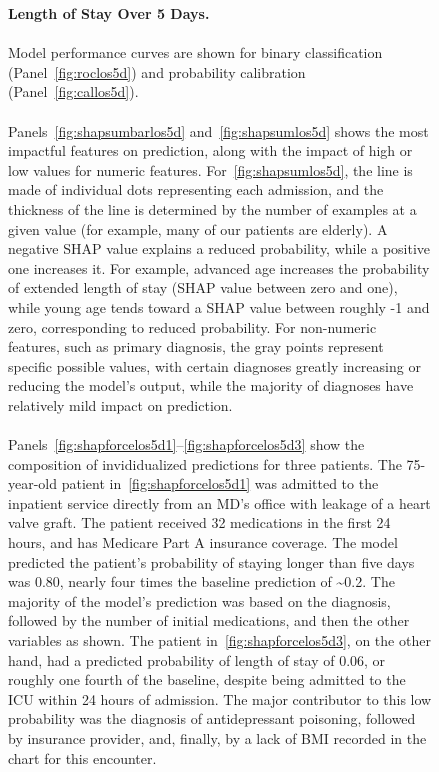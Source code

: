 \begin{figure}
\begin{adjustbox}{minipage={\linewidth},frame}
\caption{\textbf{Length of Stay Over 5 Days.} \\\\
Model performance curves are shown for binary classification (Panel~\ref{fig:roclos5d}) and probability calibration (Panel~\ref{fig:callos5d}).\\\\
Panels~\ref{fig:shapsumbarlos5d} and~\ref{fig:shapsumlos5d} shows the most impactful features on prediction, 
along with the impact of high or low values for numeric features.%
For~\ref{fig:shapsumlos5d}, the line is made of individual dots representing each admission,
and the thickness of the line is determined by the number of examples at a given value (for example, many of our patients are elderly).
A negative SHAP value explains a reduced probability, while a positive one increases it.
For example, advanced age increases the probability of extended length of stay (SHAP value between zero and one), 
while young age tends toward a SHAP value between roughly -1 and zero, corresponding to reduced probability.
For non-numeric features, such as primary diagnosis, the gray points represent specific possible values, with certain diagnoses greatly
increasing or reducing the model's output, while the majority of diagnoses have relatively mild impact on prediction.\\\\
Panels~\ref{fig:shapforcelos5d1}--\ref{fig:shapforcelos5d3} show the composition of invididualized predictions for three patients.
The 75-year-old patient in~\ref{fig:shapforcelos5d1} was admitted to the inpatient service directly from an MD's office with leakage of a heart valve graft.
The patient received 32 medications in the first 24 hours, and has Medicare Part A insurance coverage.
The model predicted the patient's probability of staying longer than five days was 0.80, 
nearly four times the baseline prediction of \textasciitilde0.2.
The majority of the model's prediction was based on the diagnosis, followed by the number of initial medications, and then the other variables as shown.
The patient in~\ref{fig:shapforcelos5d3}, on the other hand, had a predicted probability of length of stay of 0.06, 
or roughly one fourth of the baseline, despite being admitted to the ICU within 24 hours of admission.
The major contributor to this low probability was the diagnosis of antidepressant poisoning, followed by insurance provider,
and, finally, by a lack of BMI recorded in the chart for this encounter.
}\label{fig:los5d}
\end{adjustbox}
\end{figure}